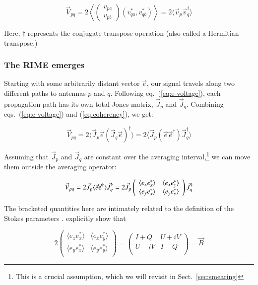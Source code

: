 \documentclass[]{aa}
\newcommand{\matrixtt}[4]{\left( \begin{array}{cc}#1&#2\\#3&#4\\\end{array} \right)}
\begin{document}
\begin{equation}\label{eq:coherency}
\vec V_{pq} = 2 \left<\left( \begin{array}{c}v_{pa}\\v_{pb}\end{array} \right) (v^*_{qa},v^*_{qb}) \right > = 2 \langle \vec v_p \vec v^\dagger_q \rangle
\end{equation}

Here, $\dagger$ represents the conjugate transpose operation (also called a Hermitian transpose.)

\subsubsection{\label{sec:RIME-emerges}The RIME emerges}

Starting with some arbitrarily distant vector $\vec e$, our signal travels along two different paths to antennas $p$ and $q$. Following eq.~(\ref{eq:e-voltage}), each propagation path has its own total Jones matrix, $\vec J_p$ and $\vec J_q$. Combining eqs.~(\ref{eq:e-voltage}) and (\ref{eq:coherency}), we get:

    \begin{equation}\label{eq:corr1}
    \vec V_{pq} = 2 \langle  \vec J_p \vec e ( \vec J_q \vec e )^\dagger \rangle  = 2 \langle  \vec J_p (\vec e \vec e^\dagger) \vec J^\dagger_q \rangle 
    \end{equation}

Assuming that $\vec J_p$ and $\vec J_q$ are constant over the averaging interval,\footnote{This is a crucial assumption, which we will revisit in Sect.~\ref{sec:smearing}} we can move them outside the averaging operator:

    \begin{equation}\label{eq:corr2}
    \vec V_{pq} = 2 \vec J_p \langle  \vec e \vec {\rm e}^\dagger \rangle  \vec J^\dagger_q = 
    2 \vec J_p 
    \matrixtt{\langle e_x e^*_x\rangle }{\langle e_x e^*_y\rangle }{\langle e_y e^*_x\rangle }{\langle e_y e^*_y\rangle }
    \vec J^\dagger_q
    \end{equation}

The bracketed quantities here are intimately related to the definition of the Stokes parameters \citep{born-wolf,tms}. \citet{ME3} explicitly show that

    \begin{equation}\label{eq:IQUV}
    2 
    \matrixtt{\langle e_x e^*_x\rangle }{\langle e_x e^*_y\rangle }{\langle e_y e^*_x\rangle }{\langle e_y e^*_y\rangle }
    = 
    \matrixtt{I+Q}{U+iV}{U-iV}{I-Q} = \vec B
    \end{equation}
\end{document}
